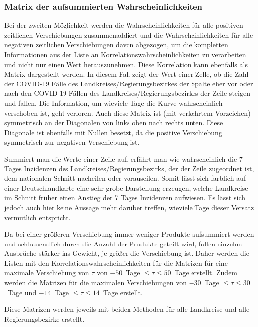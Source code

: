 \subsubsection{Matrix der aufsummierten Wahrscheinlichkeiten}
Bei der zweiten Möglichkeit werden die Wahrscheinlichkeiten für alle positiven zeitlichen Verschiebungen zusammenaddiert und die Wahrscheinlichkeiten für alle negativen zeitlichen Verschiebungen davon abgezogen, 
um die kompletten Informationen aus der Liste an Korrelationswahrscheinlichkeiten zu verarbeiten und nicht nur einen Wert herauszunehmen. Diese Korrelation kann ebenfalls als Matrix dargestellt werden. In diesem Fall zeigt der Wert einer Zelle, ob die Zahl der COVID-19 Fälle des Landkreises/Regierungsbezirkes der Spalte eher vor oder nach den COVID-19 Fällen des Landkreises/Regierungsbezirkes der Zeile steigen und fallen. Die Information, um wieviele Tage die Kurve wahrscheinlich verschoben ist, geht verloren. Auch diese Matrix ist (mit verkehrtem Vorzeichen) symmetrisch an der Diagonalen von links oben nach rechts unten. Diese Diagonale ist ebenfalls mit Nullen besetzt, da die positive Verschiebung symmetrisch zur negativen Verschiebung ist.

Summiert man die Werte einer Zeile auf, erfährt man wie wahrscheinlich die 7 Tages Inzidenzen des Landkreises/Regierungsbezirks, der der Zeile zugeordnet ist, dem nationalen Schnitt nacheilen oder vorauseilen.
Somit lässt sich farblich auf einer Deutschlandkarte eine sehr grobe Darstellung erzeugen, welche Landkreise im Schnitt früher einen Anstieg der 7 Tages Inzidenzen aufwiesen. Es lässt sich jedoch auch hier keine Aussage mehr darüber treffen, wieviele Tage dieser Versatz vermutlich entspricht.

Da bei einer größeren Verschiebung immer weniger Produkte aufsummiert werden und schlussendlich durch die Anzahl der Produkte geteilt wird, fallen einzelne Ausbrüche stärker ins Gewicht, je größer die Verschiebung ist. Daher werden die Listen mit den Korrelationswahrscheinlichkeiten für die Matrizen für eine maximale Verschiebung von $\tau$ von $-50$~Tage $\leq\tau\leq50$~Tage erstellt. Zudem werden die Matrizen für die maximalen Verschiebungen von $-30$~Tage $\leq\tau\leq30$~Tage und $-14$~Tage $\leq\tau\leq14$~Tage erstellt.

Diese Matrizen werden jeweils mit beiden Methoden für alle Landkreise und alle Regierungsbezirke erstellt.